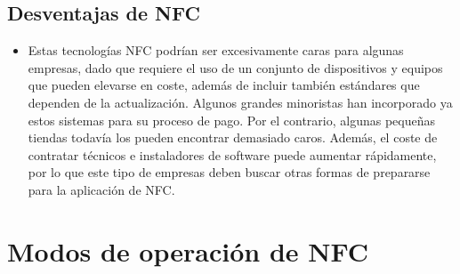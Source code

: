 \documentclass[12pt,a4paper,onecolumn,oneside]{report}
\begin{document}
\subsection{Desventajas de NFC}
\begin{itemize}
\item Estas tecnologías NFC podrían ser excesivamente caras para algunas empresas, dado que requiere el uso de un conjunto de dispositivos y equipos que pueden elevarse en coste, además de incluir también estándares que dependen de la actualización. Algunos grandes minoristas han incorporado ya estos sistemas para su proceso de pago. Por el contrario, algunas pequeñas tiendas todavía los pueden encontrar demasiado caros. Además, el coste de contratar técnicos e instaladores de software puede aumentar rápidamente, por lo que este tipo de empresas deben buscar otras formas de prepararse para la aplicación de NFC.
\end{itemize}










\section{Modos de operación de NFC}
\end{document}

